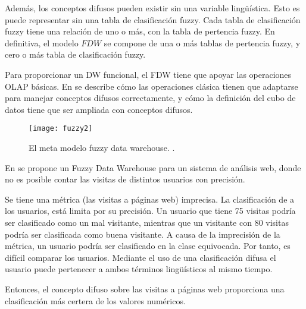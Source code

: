 \documentclass[a4paper,11pt]{article}
\begin{document}
    Además, los conceptos difusos pueden existir sin una variable lingüística. Esto es puede representar sin una tabla de clasificación fuzzy.
    Cada tabla de clasificación fuzzy tiene una relación de uno o más, con la tabla de  pertencia fuzzy. En definitiva, el modelo $FDW$ se compone de una o más tablas
    de  pertencia fuzzy, y cero o más tabla de clasificación fuzzy.
    
    Para proporcionar un DW funcional, el FDW tiene que apoyar las operaciones OLAP básicas. En \cite{Fasel14} se describe cómo las operaciones clásica tienen que
    adaptarse para manejar conceptos difusos correctamente, y cómo la definición del cubo de datos tiene que ser ampliada con conceptos difusos.
    
    \begin{figure}
      \begin{center}
        \texttt{[image: fuzzy2]}
        \caption{El meta modelo fuzzy data warehouse. \cite[p.~63]{Fasel14}.}
        \label{modeloFuzzy}
      \end{center}
    \end{figure}
    
    En \cite{Fasel09} se propone un Fuzzy Data Warehouse para un sistema de análisis web, donde no es posible contar las visitas de distintos usuarios con precisión.

    Se tiene una métrica (las visitas a páginas web) imprecisa. La clasificación de a los usuarios, está limita por su precisión.
    Un usuario que tiene 75 visitas podría ser clasificado como un mal visitante, mientras que un visitante con 80 visitas podría ser clasificada como buena visitante.
    A causa de la imprecisión de la métrica, un usuario podría ser clasificado en la clase equivocada. Por tanto, es difícil comparar los usuarios.
    Mediante el uso de una clasificación difusa el usuario puede pertenecer a ambos términos lingüísticos al mismo tiempo.
        
    Entonces, el concepto difuso sobre las visitas a páginas web proporciona una clasificación más certera de los valores numéricos.

    
\end{document}
